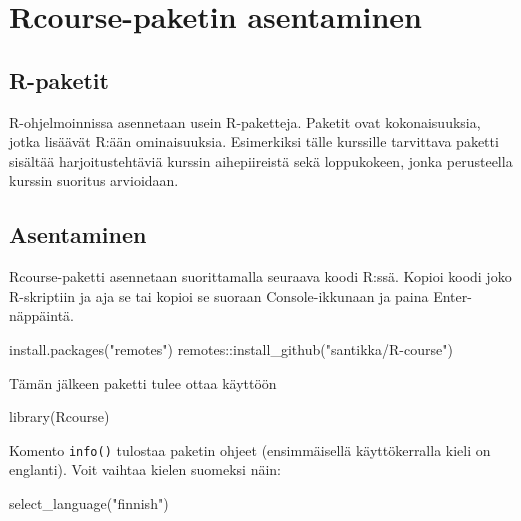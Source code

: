 \documentclass[
]{book}
\newenvironment{Shaded}{\begin{snugshade}}{\end{snugshade}}
\newcommand{\FunctionTok}[1]{\textcolor[rgb]{0.00,0.00,0.00}{#1}}
\newcommand{\NormalTok}[1]{#1}
\newcommand{\SpecialCharTok}[1]{\textcolor[rgb]{0.00,0.00,0.00}{#1}}
\newcommand{\StringTok}[1]{\textcolor[rgb]{0.31,0.60,0.02}{#1}}
\begin{document}
\hypertarget{rcourse-paketin-asentaminen}{%
\section*{Rcourse-paketin asentaminen}\label{rcourse-paketin-asentaminen}}

\hypertarget{r-paketit}{%
\subsection*{R-paketit}\label{r-paketit}}

R-ohjelmoinnissa asennetaan usein R-paketteja. Paketit ovat kokonaisuuksia, jotka lisäävät R:ään ominaisuuksia. Esimerkiksi tälle kurssille tarvittava paketti sisältää harjoitustehtäviä kurssin aihepiireistä sekä loppukokeen, jonka perusteella kurssin suoritus arvioidaan.

\hypertarget{asentaminen}{%
\subsection*{Asentaminen}\label{asentaminen}}

Rcourse-paketti asennetaan suorittamalla seuraava koodi R:ssä. Kopioi koodi joko R-skriptiin ja aja se tai kopioi se suoraan Console-ikkunaan ja paina Enter-näppäintä.

\begin{Shaded}
\begin{Highlighting}[]
\FunctionTok{install.packages}\NormalTok{(}\StringTok{"remotes"}\NormalTok{)}
\NormalTok{remotes}\SpecialCharTok{::}\FunctionTok{install\_github}\NormalTok{(}\StringTok{"santikka/R{-}course"}\NormalTok{)}
\end{Highlighting}
\end{Shaded}

Tämän jälkeen paketti tulee ottaa käyttöön

\begin{Shaded}
\begin{Highlighting}[]
\FunctionTok{library}\NormalTok{(Rcourse)}
\end{Highlighting}
\end{Shaded}

Komento \texttt{info()} tulostaa paketin ohjeet (ensimmäisellä käyttökerralla kieli on englanti). Voit vaihtaa kielen suomeksi näin:

\begin{Shaded}
\begin{Highlighting}[]
\FunctionTok{select\_language}\NormalTok{(}\StringTok{"finnish"}\NormalTok{)}
\end{Highlighting}
\end{Shaded}
\end{document}
